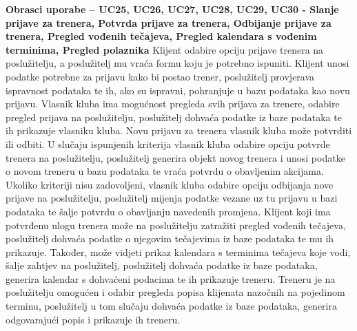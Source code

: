 				\noindent \textbf {Obrasci uporabe – UC25, UC26, UC27, UC28, UC29, UC30 - Slanje prijave za trenera, Potvrda prijave za trenera, Odbijanje prijave za trenera, Pregled vođenih tečajeva, Pregled kalendara s vođenim terminima, Pregled polaznika}
Klijent odabire opciju prijave trenera na poslužitelju, a poslužitelj mu vraća formu koju je potrebno ispuniti. Klijent unosi podatke potrebne za prijavu kako bi postao trener, poslužitelj provjerava ispravnost podataka te ih, ako su ispravni, pohranjuje u bazu podataka kao novu prijavu. Vlasnik kluba ima mogućnost pregleda svih prijava za trenere, odabire pregled prijava na poslužitelju, poslužitelj dohvaća podatke iz baze podataka te ih prikazuje vlasniku kluba. Novu prijavu za trenera vlasnik kluba može potvrditi ili odbiti. U slučaju ispunjenih kriterija vlasnik kluba odabire opciju potvrde trenera na poslužitelju, poslužitelj generira objekt novog trenera i unosi podatke o novom treneru u bazu podataka te vraća potvrdu o obavljenim akcijama. Ukoliko kriteriji nisu zadovoljeni, vlasnik kluba odabire opciju odbijanja nove prijave na poslužitelju, poslužitelj mijenja podatke vezane uz tu prijavu u bazi podataka te šalje potvrdu o obavljanju navedenih promjena.  Klijent koji ima potvrđenu ulogu trenera može na poslužitelju zatražiti pregled vođenih tečajeva, poslužitelj dohvaća podatke o njegovim tečajevima iz baze podataka te mu ih prikazuje. Također, može vidjeti prikaz kalendara s terminima tečajeva koje vodi, šalje zahtjev na poslužitelj, poslužitelj dohvaća podatke iz baze podataka, generira kalendar s dohvaćeni podacima te ih prikazuje treneru. Treneru je na poslužitelju omogućen i odabir pregleda popisa klijenata nazočnih na pojedinom terminu, poslužitelj u tom slučaju dohvaća podatke iz baze podataka, generira odgovarajući popis i prikazuje ih treneru. 
				
